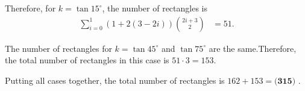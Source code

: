 \begin{enumerate}
 Therefore, for $k = \tan 15^\circ$, the number of rectangles is\begin{align*}\sum_{i=0}^1 \left( 1 + 2 \left( 3 - 2 i \right) \right)\binom{2i + 3}{2}& = 51 .\end{align*}


 The number of rectangles for $k = \tan 45^\circ$ and $\tan 75^\circ$ are the same.Therefore, the total number of rectangles in this case is $51 \cdot 3 = 153$.

 
Putting all cases together, the total number of rectangles is $162 + 153 = \boxed{\textbf{(315) }}$.

 


 


\end{enumerate}